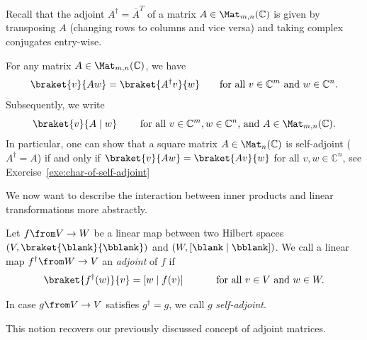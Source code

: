 \documentclass[a4paper,oneside, 12pt]{amsart}
\begin{document}
Recall that the adjoint \(A^{\dagger} = \overline{A}^{T}\) of a matrix  \(A \in \Mat_{m,n}( \mathbb{C})\) is given by transposing \(A\) (\ie changing rows to columns and vice versa) and taking complex conjugates entry-wise.

\begin{remark}\label{rmk:adjoint-and-standard-product}
  For any matrix \(A\in \Mat_{m,n}( \mathbb{C})\), we have
  \begin{equation}
    \braket{ v }{Aw} = \braket{A^{\dagger}v}{w} \qquad \text{for all \(v \in \mathbb{C}^{m}\) and \(w \in \mathbb{C}^{n}\)}.
  \end{equation}
  Subsequently, we  write
  \begin{equation}
    \braket{v}{A \mid w} \qquad \text{ for all } v\in \mathbb{C}^{m}, w \in \mathbb{C}^{n} \text{, and }A \in \Mat_{m,n}( \mathbb{C}).
  \end{equation}
  In particular, one can show that a square matrix \(A\in \Mat_{n}( \mathbb{C})\) is self-adjoint (\ie \(A^{\dagger} = A\)) if and only if
  \(\braket{ v }{Aw} = \braket{Av}{w}\) for all \(v, w \in \mathbb{C}^{n}\), see Exercise~\ref{exe:char-of-self-adjoint}
\end{remark}

We now want to describe the interaction between inner products and linear transformations more abstractly.

\begin{definition}\label{def:adjoint-of-linear-map}
  Let \(f\from V \to W\) be a linear map between two Hilbert spaces \((V, \braket{ \blank }{ \bblank})\) and \((W, [ \blank \mid \bblank])\).
  We call a linear map \(f^{\dagger} \from W \to V\) an \emph{adjoint} of \(f\) if
  \begin{equation}
    \braket{f^{\dagger}(w)}{v} = [w\mid f(v)]\qquad\quad \text{ for all } v\in V \text{ and } w\in W.
  \end{equation}

  In case \(g\from V\to V\) satisfies \(g^{\dagger} = g\), we call \(g\) \emph{self-adjoint}.
\end{definition}

This notion recovers our previously discussed concept of adjoint matrices.
\end{document}

